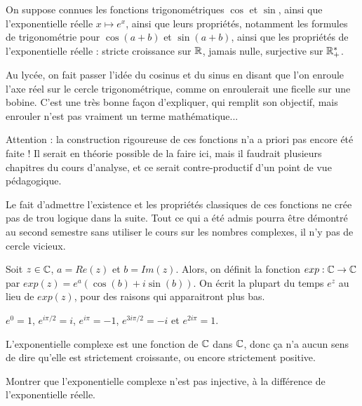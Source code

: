 On suppose connues les fonctions trigonométriques $\cos$ et $\sin$, ainsi que l'exponentielle réelle $x\mapsto e^x$, ainsi que leurs propriétés, notamment les formules de trigonométrie pour $\cos(a+b)$ et $\sin(a+b)$, ainsi que les propriétés de l'exponentielle réelle : stricte croissance sur $\mathbb{R}$, jamais nulle, surjective sur $\mathbb{R}_+^*$.

\begin{remarque}
Au lycée, on fait passer l'idée du cosinus et du sinus en disant que l'on \og enroule l'axe réel sur le cercle trigonométrique\fg, comme on enroulerait une ficelle sur une bobine. C'est une très bonne façon d'expliquer, qui remplit son objectif, mais \og enrouler\fg{} n'est pas vraiment un terme mathématique...
\end{remarque}

\begin{mdframed}
Attention : la construction rigoureuse de ces fonctions n'a a priori pas encore été faite ! Il serait en théorie possible de la faire ici, mais il faudrait plusieurs chapitres du cours d'analyse, et ce serait contre-productif d'un point de vue pédagogique.

Le fait d'admettre l'existence et les propriétés classiques de ces fonctions ne crée pas de trou logique dans la suite. Tout ce qui a été admis pourra être démontré au second semestre sans utiliser le cours sur les nombres complexes, il n'y pas de cercle vicieux.
\end{mdframed}



\begin{definition}
Soit $z \in \mathbb{C}$, $a = Re(z)$ et $b = Im(z)$. Alors, on définit la fonction $exp : \mathbb{C}\to \mathbb{C}$ par $exp(z) = e^a (\cos(b)+i \sin(b))$. On écrit la plupart du temps $e^z$ au lieu de $exp(z)$, pour des raisons qui apparaitront plus bas.
\end{definition}


\begin{exemples}
$e^0=1$, $e^{i\pi/2} = i$, $e^{i\pi}=-1$, $e^{3i\pi/2}=-i$ et $e^{2i\pi}=1$. 
\end{exemples}

\begin{attention}
L'exponentielle complexe est une fonction de $\mathbb{C}$ dans $\mathbb{C}$, donc ça n'a aucun sens de dire qu'elle est \og strictement croissante\fg, ou encore \og strictement positive\fg. 
\end{attention}
\begin{exo}
Montrer que l'exponentielle complexe n'est pas injective, à la différence de l'exponentielle réelle.
\end{exo}


